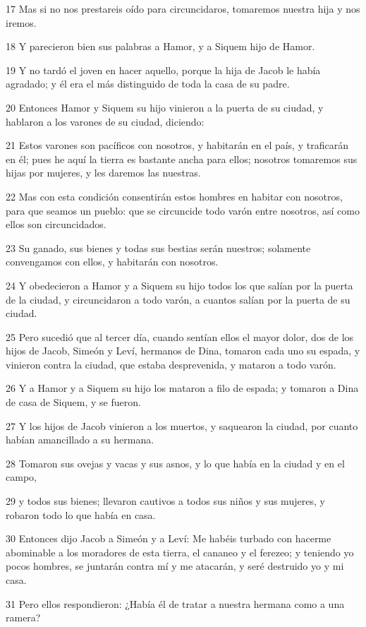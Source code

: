 \par 17 Mas si no nos prestareis oído para circuncidaros, tomaremos nuestra hija y nos iremos.
\par 18 Y parecieron bien sus palabras a Hamor, y a Siquem hijo de Hamor.
\par 19 Y no tardó el joven en hacer aquello, porque la hija de Jacob le había agradado; y él era el más distinguido de toda la casa de su padre.
\par 20 Entonces Hamor y Siquem su hijo vinieron a la puerta de su ciudad, y hablaron a los varones de su ciudad, diciendo:
\par 21 Estos varones son pacíficos con nosotros, y habitarán en el país, y traficarán en él; pues he aquí la tierra es bastante ancha para ellos; nosotros tomaremos sus hijas por mujeres, y les daremos las nuestras.
\par 22 Mas con esta condición consentirán estos hombres en habitar con nosotros, para que seamos un pueblo: que se circuncide todo varón entre nosotros, así como ellos son circuncidados.
\par 23 Su ganado, sus bienes y todas sus bestias serán nuestros; solamente convengamos con ellos, y habitarán con nosotros.
\par 24 Y obedecieron a Hamor y a Siquem su hijo todos los que salían por la puerta de la ciudad, y circuncidaron a todo varón, a cuantos salían por la puerta de su ciudad.
\par 25 Pero sucedió que al tercer día, cuando sentían ellos el mayor dolor, dos de los hijos de Jacob, Simeón y Leví, hermanos de Dina, tomaron cada uno su espada, y vinieron contra la ciudad, que estaba desprevenida, y mataron a todo varón.
\par 26 Y a Hamor y a Siquem su hijo los mataron a filo de espada; y tomaron a Dina de casa de Siquem, y se fueron.
\par 27 Y los hijos de Jacob vinieron a los muertos, y saquearon la ciudad, por cuanto habían amancillado a su hermana.
\par 28 Tomaron sus ovejas y vacas y sus asnos, y lo que había en la ciudad y en el campo,
\par 29 y todos sus bienes; llevaron cautivos a todos sus niños y sus mujeres, y robaron todo lo que había en casa.
\par 30 Entonces dijo Jacob a Simeón y a Leví: Me habéis turbado con hacerme abominable a los moradores de esta tierra, el cananeo y el ferezeo; y teniendo yo pocos hombres, se juntarán contra mí y me atacarán, y seré destruido yo y mi casa.
\par 31 Pero ellos respondieron: ¿Había él de tratar a nuestra hermana como a una ramera?

